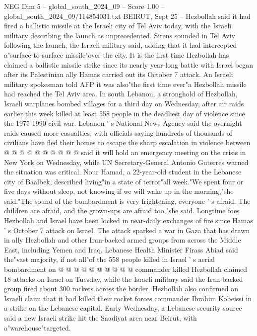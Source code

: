 \begin{textsample}{NEG Dim 5 – global\_south\_2024\_09 – Score 1.00 – global\_south\_2024\_09/114854031.txt}  \label{ex:f5_neg_196}
BEIRUT, Sept 25 -- Hezbollah said it had fired a ballistic missile at the Israeli city of Tel Aviv today, with the Israeli military describing the launch as unprecedented.
Sirens sounded in Tel Aviv following the launch, the Israeli military said, adding that it had intercepted a"surface-to-surface missile"over the city.
It is the first time Hezbollah has claimed a ballistic missile strike since its nearly year-long battle with Israel began after its Palestinian ally Hamas carried out its October 7 attack.
An Israeli military spokesman told AFP it was also"the first time ever"a Hezbollah missile had reached the Tel Aviv area.
In south Lebanon, a stronghold of Hezbollah, Israeli warplanes bombed villages for a third day on Wednesday, after air raids earlier this week killed at least 558 people in the deadliest day of violence since the 1975-1990 civil war.
Lebanon ' s National News Agency said the overnight raids caused more casualties, with officials saying hundreds of thousands of civilians have fled their homes to escape the sharp escalation in violence between @ @ @ @ @ @ @ @ @ @ said it will hold an emergency meeting on the crisis in New York on Wednesday, while UN Secretary-General Antonio Guterres warned the situation was critical.
Nour Hamad, a 22-year-old student in the Lebanese city of Baalbek, described living"in a state of terror"all week."We spent four or five days without sleep, not knowing if we will wake up in the morning,"she said."The sound of the bombardment is very frightening, everyone ' s afraid.
The children are afraid, and the grown-ups are afraid too,"she said.
Longtime foes Hezbollah and Israel have been locked in near-daily exchanges of fire since Hamas ' s October 7 attack on Israel.
The attack sparked a war in Gaza that has drawn in ally Hezbollah and other Iran-backed armed groups from across the Middle East, including Yemen and Iraq.
Lebanese Health Minister Firass Abiad said the"vast majority, if not all"of the 558 people killed in Israel ' s aerial bombardment on @ @ @ @ @ @ @ @ @ @ commander killed Hezbollah claimed 18 attacks on Israel on Tuesday, while the Israeli military said the Iran-backed group fired about 300 rockets across the border.
Hezbollah also confirmed an Israeli claim that it had killed their rocket forces commander Ibrahim Kobeissi in a strike on the Lebanese capital.
Early Wednesday, a Lebanese security source said a new Israeli strike hit the Saadiyat area near Beirut, with a"warehouse"targeted.

\end{textsample}
